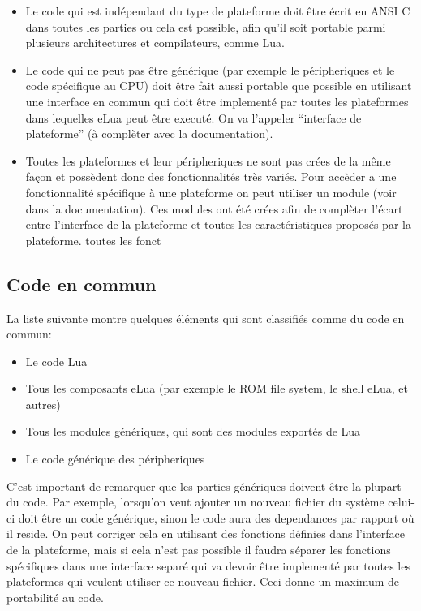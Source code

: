 \begin{itemize}
 \item Le code qui est indépendant du type de plateforme doit être écrit en ANSI C dans toutes les parties ou cela est possible, afin qu'il soit
portable parmi plusieurs architectures et compilateurs, comme Lua. 

 \item Le code qui ne peut pas être générique (par exemple le péripheriques et le code spécifique au CPU) doit être fait aussi portable que possible en
utilisant une interface en commun qui doit être implementé par toutes les plateformes dans lequelles eLua peut être executé. On va l'appeler ``interface
de plateforme'' (à complèter avec la documentation).

 \item Toutes les plateformes et leur péripheriques ne sont pas crées de la même façon et possèdent donc des fonctionnalités très variés. Pour accèder
a une fonctionnalité spécifique à une plateforme on peut utiliser un module (voir dans la documentation). Ces modules ont été crées afin de complèter 
l'écart entre l'interface de la plateforme et toutes les caractéristiques proposés par la plateforme.
toutes les fonct
  
\end{itemize}

\subsection{Code en commun}

La liste suivante montre quelques éléments qui sont classifiés comme du code en commun:

\begin{itemize}
 \item Le code Lua
 \item Tous les composants eLua (par exemple le ROM file system, le shell eLua, et autres)
 \item Tous les modules génériques, qui sont des modules exportés de Lua
 \item Le code générique des péripheriques
\end{itemize}

C'est important de remarquer que les parties génériques doivent être la plupart du code. Par exemple, lorsqu'on veut ajouter un nouveau fichier du système
celui-ci doit être un code générique, sinon le code aura des dependances par rapport où il reside. On peut corriger cela en utilisant des fonctions
définies dans l'interface de la plateforme, mais si cela n'est pas possible il faudra séparer les fonctions spécifiques dans une interface separé qui va
devoir être implementé par toutes les plateformes qui veulent utiliser ce nouveau fichier. Ceci donne un maximum de portabilité au code.

